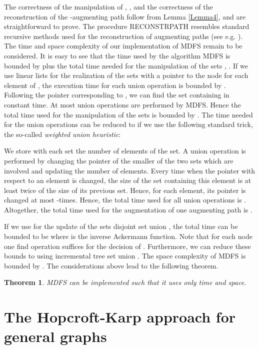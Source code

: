\documentclass[12pt,twoside,a4paper]{article}
\newtheorem{theo}{Theorem}
\begin{document}
\medskip
\noindent
The correctness of the manipulation of , 
, and the correctness of the reconstruction of the -augmenting
path  follow from Lemma \ref{Lemma4}, and are straightforward to prove.
The procedure RECONSTRPATH resembles standard recursive methods used for
the reconstruction of augmenting paths (see e.g. \cite{Ta}).
The time and space complexity of our implementation of MDFS remain to be
considered. It is easy to see that the time used by the algorithm MDFS is bounded
by  plus the total time needed for the manipulation of the sets
, .
If we use linear lists for the realization of the sets  with a 
pointer to the node  for each element of , the 
execution time for each union operation is bounded by . Following the 
pointer corresponding to , we can find the set containing  
in constant time.
At most  union operations are performed by MDFS. 
Hence the total time used for the manipulation of the sets  is 
bounded by . The time needed for the  union operations can be 
reduced to  if we use the following standard trick,
the so-called {\em weighted union heuristic\/}:

\medskip
We store with each set the number of elements of the set. A union operation 
is performed by changing the pointer of the smaller of the two sets which are
involved and updating the number of elements. Every time when the pointer with 
respect to an element is changed,
the size of the set containing this element is at least twice of the size of
its previous set. Hence, for each element, its pointer is changed at most
-times. Hence, the total time used for all union operations is 
. Altogether, the total time used for the augmentation of one 
augmenting path is .

\medskip
If we use for the update of the sets  disjoint set 
union \cite{Ta}, the total time can be bounded to be 
where  is the inverse Ackermann function.
Note that for each node  one find operation suffices for the decision 
of .
Furthermore, we can reduce these bounds to  using incremental tree set
union \cite{GaTa}.
The space complexity of MDFS is bounded by . The considerations above 
lead to the following theorem.
\begin{theo}
MDFS can be implemented such that it uses only  time and  
space.
\end{theo}

\section{The Hopcroft-Karp approach for general graphs}
\end{document}
